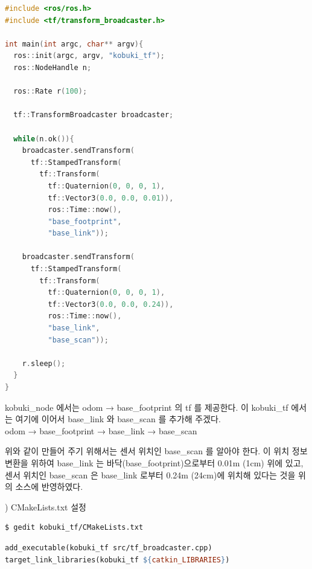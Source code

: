 \vspace{\baselineskip}
\begin{lstlisting}[language=C++]
#include <ros/ros.h>
#include <tf/transform_broadcaster.h>

int main(int argc, char** argv){
  ros::init(argc, argv, "kobuki_tf");
  ros::NodeHandle n;

  ros::Rate r(100);

  tf::TransformBroadcaster broadcaster;

  while(n.ok()){
    broadcaster.sendTransform(
      tf::StampedTransform(
        tf::Transform(
          tf::Quaternion(0, 0, 0, 1),
          tf::Vector3(0.0, 0.0, 0.01)),
          ros::Time::now(),
          "base_footprint",
          "base_link"));

    broadcaster.sendTransform(
      tf::StampedTransform(
        tf::Transform(
          tf::Quaternion(0, 0, 0, 1),
          tf::Vector3(0.0, 0.0, 0.24)),
          ros::Time::now(),
          "base_link",
          "base_scan"));

    r.sleep();
  }
}
\end{lstlisting}

\noindent
kobuki\_node 에서는 odom → base\_footprint 의 tf 를 제공한다. 이 kobuki\_tf 에서는 여기에 이어서 base\_link 와 base\_scan 를 추가해 주겠다.\\


odom → base\_footprint  → base\_link → base\_scan

\vspace{\baselineskip}
\noindent
위와 같이 만들어 주기 위해서는 센서 위치인 base\_scan 를 알아야 한다. 이 위치 정보 변환을 위하여 base\_link 는 바닥(base\_footprint)으로부터 0.01m (1cm) 위에 있고, 센서 위치인 base\_scan 은 base\_link 로부터 0.24m (24cm)에 위치해 있다는 것을 위의 소스에 반영하였다.

\vspace{\baselineskip}
\noindent
{}
\thenum) CMakeLists.txt 설정

\vspace{\baselineskip}
\begin{lstlisting}[language=ROS]
$ gedit kobuki_tf/CMakeLists.txt 
\end{lstlisting}

\begin{lstlisting}[language=make]
add_executable(kobuki_tf src/tf_broadcaster.cpp)
target_link_libraries(kobuki_tf ${catkin_LIBRARIES})
\end{lstlisting}

